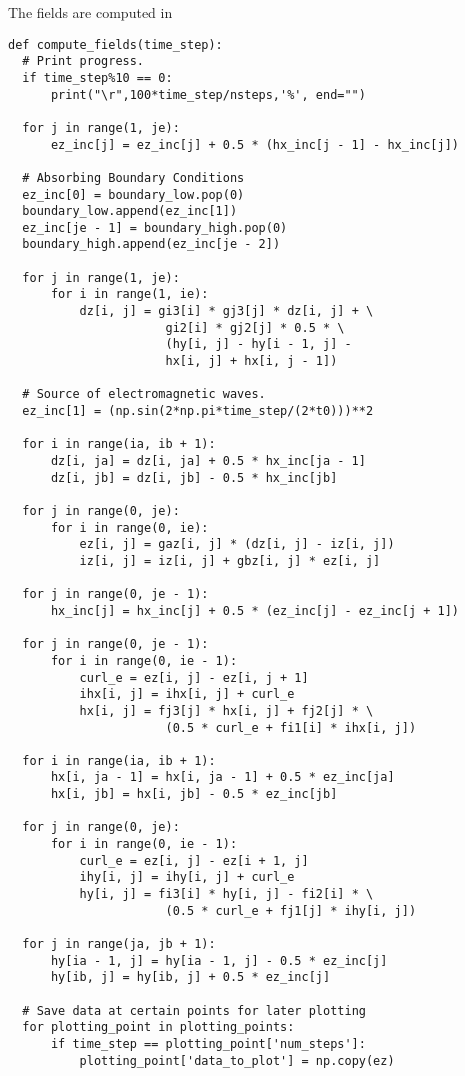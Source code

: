 \documentclass[11pt]{article}
\numberwithin{equation}{section}
\begin{document}
The fields are computed in
\begin{verbatim}
def compute_fields(time_step):
  # Print progress.
  if time_step%10 == 0:
      print("\r",100*time_step/nsteps,'%', end="")

  for j in range(1, je):
      ez_inc[j] = ez_inc[j] + 0.5 * (hx_inc[j - 1] - hx_inc[j])

  # Absorbing Boundary Conditions
  ez_inc[0] = boundary_low.pop(0)
  boundary_low.append(ez_inc[1])
  ez_inc[je - 1] = boundary_high.pop(0)
  boundary_high.append(ez_inc[je - 2])

  for j in range(1, je):
      for i in range(1, ie):
          dz[i, j] = gi3[i] * gj3[j] * dz[i, j] + \
                      gi2[i] * gj2[j] * 0.5 * \
                      (hy[i, j] - hy[i - 1, j] -
                      hx[i, j] + hx[i, j - 1])

  # Source of electromagnetic waves.
  ez_inc[1] = (np.sin(2*np.pi*time_step/(2*t0)))**2

  for i in range(ia, ib + 1):
      dz[i, ja] = dz[i, ja] + 0.5 * hx_inc[ja - 1]
      dz[i, jb] = dz[i, jb] - 0.5 * hx_inc[jb]

  for j in range(0, je):
      for i in range(0, ie):
          ez[i, j] = gaz[i, j] * (dz[i, j] - iz[i, j])
          iz[i, j] = iz[i, j] + gbz[i, j] * ez[i, j]

  for j in range(0, je - 1):
      hx_inc[j] = hx_inc[j] + 0.5 * (ez_inc[j] - ez_inc[j + 1])

  for j in range(0, je - 1):
      for i in range(0, ie - 1):
          curl_e = ez[i, j] - ez[i, j + 1]
          ihx[i, j] = ihx[i, j] + curl_e
          hx[i, j] = fj3[j] * hx[i, j] + fj2[j] * \
                      (0.5 * curl_e + fi1[i] * ihx[i, j])

  for i in range(ia, ib + 1):
      hx[i, ja - 1] = hx[i, ja - 1] + 0.5 * ez_inc[ja]
      hx[i, jb] = hx[i, jb] - 0.5 * ez_inc[jb]

  for j in range(0, je):
      for i in range(0, ie - 1):
          curl_e = ez[i, j] - ez[i + 1, j]
          ihy[i, j] = ihy[i, j] + curl_e
          hy[i, j] = fi3[i] * hy[i, j] - fi2[i] * \
                      (0.5 * curl_e + fj1[j] * ihy[i, j])

  for j in range(ja, jb + 1):
      hy[ia - 1, j] = hy[ia - 1, j] - 0.5 * ez_inc[j]
      hy[ib, j] = hy[ib, j] + 0.5 * ez_inc[j]

  # Save data at certain points for later plotting
  for plotting_point in plotting_points:
      if time_step == plotting_point['num_steps']:
          plotting_point['data_to_plot'] = np.copy(ez)
\end{verbatim}
\end{document}
